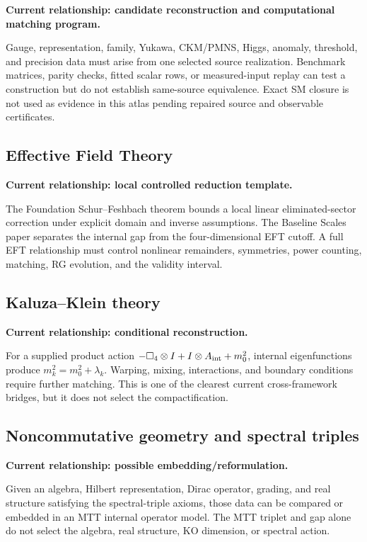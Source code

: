 \documentclass[11pt]{article}
\begin{document}
\textbf{Current relationship: candidate reconstruction and computational
matching program.}

Gauge, representation, family, Yukawa, CKM/PMNS, Higgs, anomaly, threshold,
and precision data must arise from one selected source realization. Benchmark
matrices, parity checks, fitted scalar rows, or measured-input replay can test
a construction but do not establish same-source equivalence. Exact SM closure
is not used as evidence in this atlas pending repaired source and observable
certificates.

\subsection{Effective Field Theory}

\textbf{Current relationship: local controlled reduction template.}

The Foundation Schur--Feshbach theorem bounds a local linear eliminated-sector
correction under explicit domain and inverse assumptions. The Baseline Scales
paper separates the internal gap from the four-dimensional EFT cutoff. A full
EFT relationship must control nonlinear remainders, symmetries, power counting,
matching, RG evolution, and the validity interval.

\subsection{Kaluza--Klein theory}

\textbf{Current relationship: conditional reconstruction.}

For a supplied product action
$-\Box_4\otimes I+I\otimes A_{\rm int}+m_0^2$, internal eigenfunctions produce
$m_k^2=m_0^2+\lambda_k$. Warping, mixing, interactions, and boundary
conditions require further matching. This is one of the clearest current
cross-framework bridges, but it does not select the compactification.

\subsection{Noncommutative geometry and spectral triples}

\textbf{Current relationship: possible embedding/reformulation.}

Given an algebra, Hilbert representation, Dirac operator, grading, and real
structure satisfying the spectral-triple axioms, those data can be compared or
embedded in an MTT internal operator model. The MTT triplet and gap alone do
not select the algebra, real structure, KO dimension, or spectral action.
\end{document}
